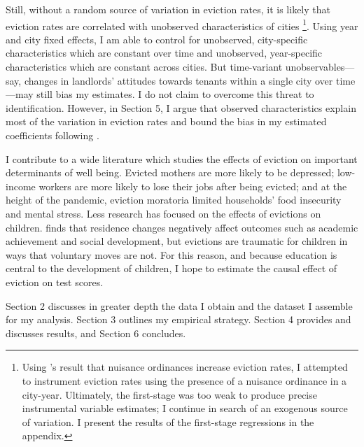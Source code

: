\documentclass[12pt]{article}
\begin{document}
Still, without a random source of variation in eviction rates, it is likely that eviction rates are correlated with unobserved characteristics of cities \footnote{Using \cite{kroeger_nuisance_2020}'s result that nuisance ordinances increase eviction rates, I attempted to instrument eviction rates using the presence of a nuisance ordinance in a city-year. Ultimately, the first-stage was too weak to produce precise instrumental variable estimates; I continue in search of an exogenous source of variation. I present the results of the first-stage regressions in the appendix.}. Using year and city fixed effects, I am able to control for unobserved, city-specific characteristics which are constant over time and unobserved, year-specific characteristics which are constant across cities. But time-variant unobservables—say, changes in landlords' attitudes towards tenants within a single city over time—may still bias my estimates. I do not claim to overcome this threat to identification. However, in Section 5, I argue that observed characteristics explain most of the variation in eviction rates and bound the bias in my estimated coefficients following \cite{oster_unobservable_2019}.

I contribute to a wide literature which studies the effects of eviction on important determinants of well being. Evicted mothers are more likely to be depressed; low-income workers are more likely to lose their jobs after being evicted; and at the height of the pandemic, eviction moratoria limited households’ food insecurity and mental stress\citep{desmond_housing_2016, desmond_evictions_2015, an_covid-19_2021}. Less research has focused on the effects of evictions on children. \cite{grigg_school_2012} finds that residence changes negatively affect outcomes such as academic achievement and social development, but evictions are traumatic for children in ways that voluntary moves are not. For this reason, and because education is central to the development of children, I hope to estimate the causal effect of eviction on test scores.

Section 2 discusses in greater depth the data I obtain and the dataset I assemble for my analysis. Section 3 outlines my empirical strategy. Section 4 provides and discusses results, and Section 6 concludes.
\end{document}
